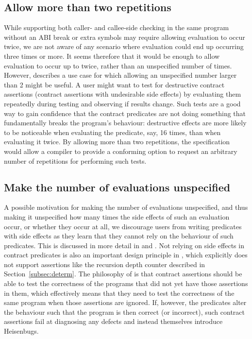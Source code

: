 \subsection{Allow more than two repetitions}
\label{subsec:rep}

While supporting both caller- and callee-side checking in the same program without an ABI break or extra symbols may require allowing evaluation to occur twice, we are not aware of any scenario where evaluation could end up occurring three times or more. It seems therefore that it would be enough to allow evaluation to occur up to twice, rather than an unspecified number of times. However, \cite{P3119R0} describes a use case for which allowing an unspecified number larger than 2 might be useful. A user might want to test for destructive contract assertions (contract assertions with undesirable side effects) by evaluating them repeatedly during testing and observing if results change.  Such tests are a good way to gain confidence that the contract predicates are not doing something that fundamentally breaks the program's behaviour: destructive effects are more likely to be noticeable when evaluating the predicate, say, 16 times, than when evaluating it twice. By allowing more than two repetitions, the specification would allow a compiler to provide a conforming option to request an arbitrary number of repetitions for performing such tests.

\subsection{Make the number of evaluations unspecified}
\label{subsec:discourage}

A possible motivation for making the number of evaluations unspecified, and thus making it unspecified how many times the side effects of such an evaluation occur, or whether they occur at all, we discourage users from writing predicates with side effects as they learn that they cannot rely on the behaviour of such predicates. This is discussed in more detail in \cite{P1670R0} and \cite{P2751R1}. Not relying on side effects in contract predicates is also an important design principle in \cite{P2900R6}, which explicitly does not support assertions like the recursion depth counter described in Section~\ref{subsec:determ}. The philosophy of \cite{P2900R6} is that contract assertions should be able to test the correctness of the programs that did not yet have those assertions in them, which effectively means that they need to test the correctness of the same program when those assertions are ignored. If, however, the predicates alter the behaviour such that the program is then correct (or incorrect), such contract assertions fail at diagnosing any defects and instead themselves introduce Heisenbugs.

